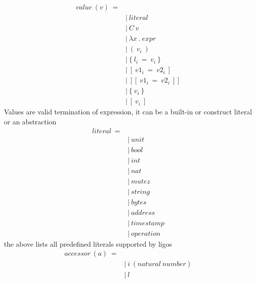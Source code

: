 \documentclass[10pt,a4paper]{article}
\begin{document}
\begin{align*}
value\ (v)\ = 
\\
 \ &|\ literal                         \ \tag{values\ of\ built-in\ types}
\\
 \ &|\ C\ v                             \ \tag{values\ of\ construct\ types}
\\
 \ &|\ \lambda x\ .\ expr                       \ \tag{lambda\ abstraction\ values}
\\
 \ &|\ (\ v_i\ )                         \ \tag{tuple\ values}
\\
 \ &|\ \{\ l_i\ =\ v_i\ \}                   \ \tag{record\ values}
\\
 \ &|\ [\ v1_i\ =\ v2_i\ ]                 \ \tag{map\ values}
\\
 \ &|\ [[\ v1_i\ =\ v2_i\ ]]               \ \tag{big\ map\ values}
\\
 \ &|\ \{\ v_i\ \}                         \ \tag{set\ values}
\\
 \ &|\ [\ v_i\ ]                         \ \tag{list\ values}
\end{align*}
Values are valid termination of expression, it can be a built-in or construct literal or an abstraction
\begin{align*}
literal\ =
\\
 \ &|\ unit                            \ \tag{}
\\
 \ &|\ bool                            \ \tag{}
\\
 \ &|\ int                             \ \tag{}
\\
 \ &|\ nat                             \ \tag{}
\\
 \ &|\ mutez                           \ \tag{}
\\
 \ &|\ string                          \ \tag{}
\\
 \ &|\ bytes                           \ \tag{}
\\
 \ &|\ address                         \ \tag{}
\\
 \ &|\ timestamp                       \ \tag{}
\\
 \ &|\ operation                       \ \tag{}
\end{align*}
the above lists all predefined literals supported by ligos
\begin{align*}
accessor\ (a)\ = 
\\
 \ &|\ i\ (natural\ number)              \ \tag{for\ tuples}
\\
 \ &|\ l                               \ \tag{for\ record}
\end{align*}
\end{document}
